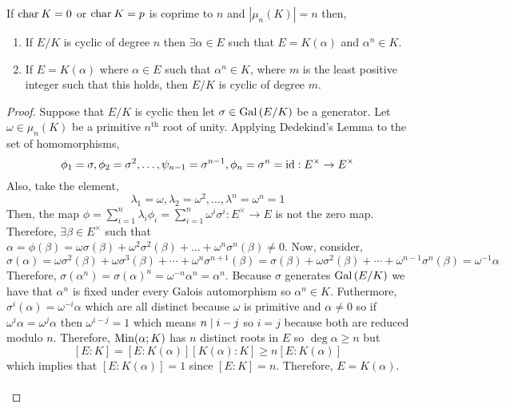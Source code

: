 \documentclass[12pt]{extarticle}
\begin{document}
\begin{theorem}
If $\mathrm{char} \: K = 0$ or $\mathrm{char} \: K = p$ is coprime to $n$ and $|\mu_n(K)| = n$ then,
\begin{enumerate}
\item If $E/K$ is cyclic of degree $n$ then $\exists \alpha \in E$ such that $E = K(\alpha)$ and $\alpha^n \in K$.
\item If $E = K(\alpha)$ where $\alpha \in E$ such that $\alpha^n \in K$, where $m$ is the least positive integer such that this holds, then $E/K$ is cyclic of degree $m$.
\end{enumerate}
\end{theorem}

\begin{proof}
Suppose that $E/K$ is cyclic then let $\sigma \in \mathrm{Gal}\left( E/K \right)$ be a generator. Let $\omega \in \mu_n(K)$ be a primitive $n^{\mathrm{th}}$ root of unity. Applying Dedekind's Lemma to the set of homomorphisms,
\[\phi_1 = \sigma, \phi_2 = \sigma^2, \dots, \psi_{n-1} = \sigma^{n-1}, \phi_n =  \sigma^n = \mathrm{id} : E^{\times} \to E^{\times}\] Also, take the element,
\[\lambda_1 = \omega, \lambda_2 = \omega^2, \dots, \lambda^n = \omega^n = 1\]
Then, the map $\phi = \sum\limits_{i = 1}^n \lambda_i \phi_i = \sum\limits_{i = 1}^n \omega^i \sigma^i : E^\times \to E$ is not the zero map. Therefore, $\exists \beta \in E^\times$ such that $\alpha = \phi(\beta) = \omega \sigma(\beta) + \omega^2 \sigma^2(\beta) + \dots + \omega^n \sigma^n(\beta) \neq 0$. Now, consider,
\[\sigma(\alpha) = \omega \sigma^2(\beta) + \omega \sigma^3(\beta) + \cdots + \omega^n \sigma^{n+1}(\beta) = \sigma(\beta) + \omega \sigma^2(\beta) + \cdots + \omega^{n-1} \sigma^n(\beta) = \omega^{-1} \alpha\] 
Therefore, $\sigma(\alpha^n) = \sigma(\alpha)^n = \omega^{-n} \alpha^n = \alpha^n$. Because $\sigma$ generates $\mathrm{Gal}\left( E/K \right)$ we have that $\alpha^n$ is fixed under every Galois automorphism so $\alpha^n \in K$. Futhermore, $\sigma^i(\alpha) = \omega^{-i} \alpha$ which are all distinct because $\omega$ is primitive and $\alpha \neq 0$ so if $\omega^i \alpha = \omega^j \alpha$ then $\omega^{i-j} = 1$ which means $n \mid i - j$ so $i = j$ because both are reduced modulo $n$. Therefore, $\mathrm{Min}(\alpha;K)$ has $n$ distinct roots in $E$ so $\deg{\alpha} \ge n$ but \[[E : K] = [E : K(\alpha)] [K(\alpha) : K] \ge n [E : K(\alpha)]\] which implies that $[E : K(\alpha)] = 1$ since $[E : K] = n$. Therefore, $E = K(\alpha)$. \bigskip \\\\

\end{proof}
\end{document}
